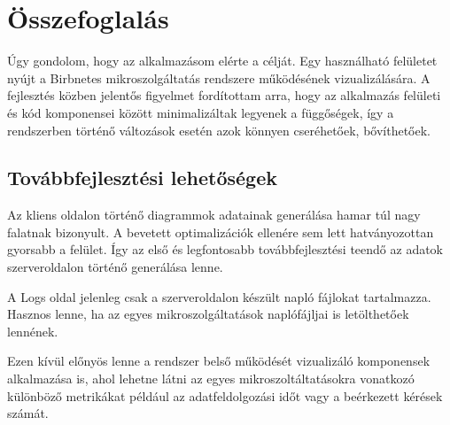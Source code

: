 \chapter{Összefoglalás}
\label{chapt:summary}
Úgy gondolom, hogy az alkalmazásom elérte a célját.
Egy használható felületet nyújt a Birbnetes mikroszolgáltatás rendszere működésének vizualizálására.
A fejlesztés közben jelentős figyelmet fordítottam arra, hogy az alkalmazás felületi és kód komponensei között
minimalizáltak legyenek a függőségek, így a rendszerben történő változások esetén azok könnyen cseréhetőek, bővíthetőek.
\section{Továbbfejlesztési lehetőségek}
Az kliens oldalon történő diagrammok adatainak generálása hamar túl nagy falatnak bizonyult.
A bevetett optimalizációk ellenére sem lett hatványozottan gyorsabb a felület.
Így az első és legfontosabb továbbfejlesztési teendő az adatok szerveroldalon történő generálása lenne.

A Logs oldal jelenleg csak a szerveroldalon készült napló fájlokat tartalmazza.
Hasznos lenne, ha az egyes mikroszolgáltatások naplófájljai is letölthetőek lennének.

Ezen kívül előnyös lenne a rendszer belső működését vizualizáló komponensek alkalmazása is, 
ahol lehetne látni az egyes mikroszoltáltatásokra vonatkozó különböző metrikákat például az adatfeldolgozási időt vagy a beérkezett kérések számát. 